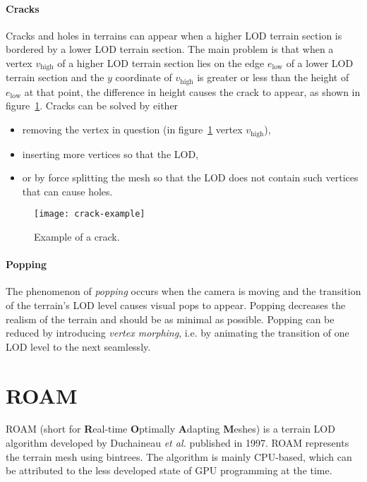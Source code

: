 \paragraph{Cracks} Cracks and holes in terrains can appear when a higher LOD terrain section is bordered 
by a lower LOD terrain section. The main problem is that when a vertex $v_{\text{high}}$ of a higher LOD terrain section lies on the edge $e_{\text{low}}$
of a lower LOD terrain section and the $y$ coordinate of $v_{\text{high}}$ is greater or less than the 
height of $e_{\text{low}}$ at that point, the difference in height causes the crack to appear, as shown in figure~\ref{fig:crack-example}.
Cracks can be solved by either 
\begin{itemize}
  \item removing the vertex in question (in figure~\ref{fig:crack-example} vertex $v_{\text{high}}$),
  \item inserting more vertices so that the LOD,
  \item or by force splitting the mesh so that the LOD does not contain such vertices that can cause holes.
\end{itemize}

\begin{figure}
  \centering
  \texttt{[image: crack-example]}
  \caption{Example of a crack.}\label{fig:crack-example}
\end{figure}

\paragraph{Popping} The phenomenon of \textit{popping} occurs when the camera is moving 
and the transition of the terrain's LOD level causes visual pops to appear.
Popping decreases the realism of the terrain and should be as minimal as possible.
Popping can be reduced by introducing \textit{vertex morphing}, 
i.e. by animating the transition of one LOD level to the next seamlessly.

\section{ROAM}
ROAM (short for \textbf{R}eal-time \textbf{O}ptimally \textbf{A}dapting \textbf{M}eshes) 
is a terrain LOD algorithm developed by Duchaineau \textit{et al.} \cite{roam} published in 1997.
ROAM represents the terrain mesh using bintrees. The algorithm is mainly CPU-based, which 
can be attributed to the less developed state of GPU programming at the time.

